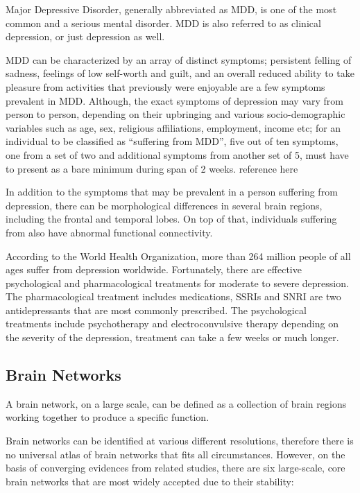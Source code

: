 \documentclass{article}
\begin{document}
Major Depressive Disorder, generally abbreviated as MDD, is one of the
most common and a serious mental disorder. MDD is also referred to as
clinical depression, or just depression as well.

MDD can be characterized by an array of distinct symptoms; persistent
felling of sadness, feelings of low self-worth and guilt, and an
overall reduced ability to take pleasure from activities that
previously were enjoyable are a few symptoms prevalent in MDD.
Although, the exact symptoms of depression may vary from person to
person, depending on their upbringing and various socio-demographic
variables such as age, sex, religious affiliations, employment, income
etc; for an individual to be classified as ``suffering from MDD'',
five out of ten symptoms, one from a set of two and %
additional symptoms from another set of 5, must have to %
present as a bare minimum during span of 2 weeks.  %
reference here

In addition to the symptoms that may be prevalent in a person
suffering from depression, there can be morphological differences in
several brain regions, including the frontal and temporal lobes. On
top of that, individuals suffering from  also have abnormal functional
connectivity. %

According to the World Health Organization, more than 264 million
people of all ages suffer from depression worldwide. Fortunately,
there are effective psychological and pharmacological treatments for
moderate to severe depression. The pharmacological treatment includes
medications, SSRIs and SNRI are two antidepressants that are most
commonly prescribed. The psychological treatments include
psychotherapy and electroconvulsive therapy depending on the severity
of the depression, treatment can take a few weeks or much longer.

\subsection{Brain Networks}

A brain network, on a large scale, can be defined as a collection of
brain regions working together to produce a specific function.

Brain networks can be identified at various different resolutions,
therefore there is no universal atlas of brain networks that fits all
circumstances. However, on the basis of converging evidences from
related studies, there are six large-scale, core brain networks that
are most widely accepted due to their stability:
\end{document}
